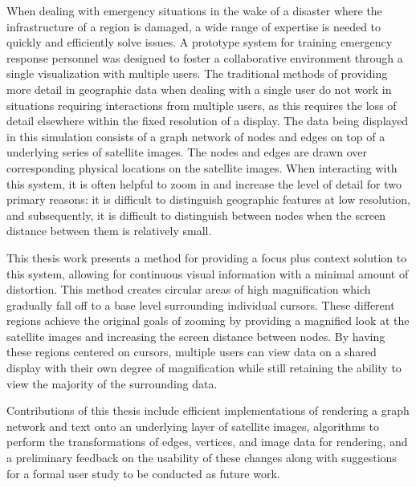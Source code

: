 
When dealing with emergency situations in the wake of a disaster where the infrastructure of a region is damaged, a wide range of expertise is needed to quickly and efficiently solve issues. A prototype system for training emergency response personnel was designed to foster a collaborative environment through a single visualization with multiple users. The traditional methods of providing more detail in geographic data when dealing with a single user do not work in situations
requiring interactions from multiple users, as this requires the loss of detail elsewhere within the fixed resolution of a display. The data being displayed in this simulation consists of a graph network of nodes and edges on top of a underlying series of satellite images. The nodes and edges are drawn over corresponding physical locations on the satellite images. When interacting with this system, it is often helpful to
zoom in and increase the level of detail for two primary reasons: it is difficult to distinguish geographic features at low resolution,
and subsequently, it is difficult to distinguish between nodes when the screen distance between them is relatively small. 

This thesis work presents a method for providing a focus plus context
solution to this system, allowing for continuous visual information with a minimal amount of distortion. This method creates circular
areas of high magnification which gradually fall off to a base level surrounding individual cursors.
These different regions achieve the original goals of zooming by providing a magnified look at
the satellite images and increasing the screen distance between nodes. By having these regions
centered on cursors, multiple users can view data on a shared display with their own degree
of magnification while still retaining the ability to view the majority of the surrounding data.

Contributions of this thesis include efficient implementations of rendering a graph network 
and text onto an underlying layer of satellite images, algorithms to perform the transformations of edges, vertices, and image data for rendering, and a preliminary feedback on the usability of these changes along with suggestions for a formal user study to be conducted as future work.
